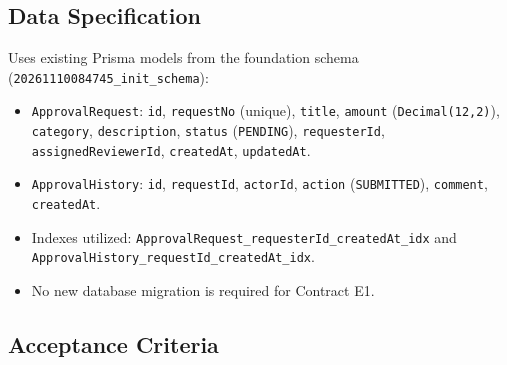 \documentclass[11pt,a4paper]{article}
\begin{document}
\subsection{Data Specification}

Uses existing Prisma models from the foundation schema (\texttt{20261110084745\_init\_schema}):\\
\begin{itemize}[leftmargin=*,itemsep=2pt,topsep=2pt]
  \item \texttt{ApprovalRequest}: \texttt{id}, \texttt{requestNo} (unique), \texttt{title}, \texttt{amount} (\texttt{Decimal(12,2)}), \texttt{category}, \texttt{description}, \texttt{status} (\texttt{PENDING}), \texttt{requesterId}, \texttt{assignedReviewerId}, \texttt{createdAt}, \texttt{updatedAt}.
  \item \texttt{ApprovalHistory}: \texttt{id}, \texttt{requestId}, \texttt{actorId}, \texttt{action} (\texttt{SUBMITTED}), \texttt{comment}, \texttt{createdAt}.
  \item Indexes utilized: \texttt{ApprovalRequest\_requesterId\_createdAt\_idx} and \texttt{ApprovalHistory\_requestId\_createdAt\_idx}.
  \item No new database migration is required for Contract E1.
\end{itemize}

\subsection{Acceptance Criteria}
\end{document}
